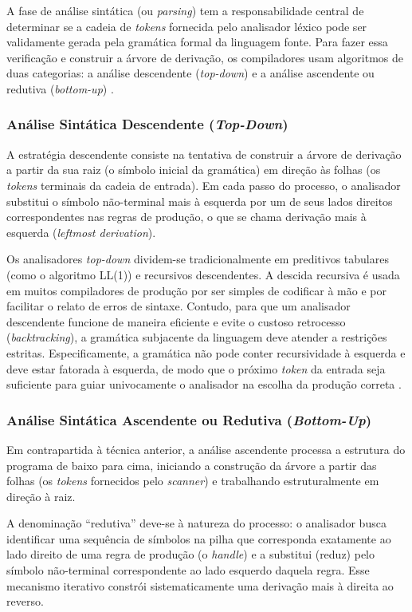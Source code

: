 A fase de análise sintática (ou \textit{parsing}) tem a responsabilidade central de determinar se a cadeia de \textit{tokens} fornecida pelo analisador léxico pode ser validamente gerada pela gramática formal da linguagem fonte. Para fazer essa verificação e construir a árvore de derivação, os compiladores usam algoritmos de duas categorias: a análise descendente (\textit{top-down}) e a análise ascendente ou redutiva (\textit{bottom-up}) \cite{aho1995,cooper2012}.

\subsubsection*{Análise Sintática Descendente (\textit{Top-Down})}
A estratégia descendente consiste na tentativa de construir a árvore de derivação a partir da sua raiz (o símbolo inicial da gramática) em direção às folhas (os \textit{tokens} terminais da cadeia de entrada). Em cada passo do processo, o analisador substitui o símbolo não-terminal mais à esquerda por um de seus lados direitos correspondentes nas regras de produção, o que se chama derivação mais à esquerda (\textit{leftmost derivation}).

Os analisadores \textit{top-down} dividem-se tradicionalmente em preditivos tabulares (como o algoritmo LL(1)) e recursivos descendentes. A descida recursiva é usada em muitos compiladores de produção por ser simples de codificar à mão e por facilitar o relato de erros de sintaxe. Contudo, para que um analisador descendente funcione de maneira eficiente e evite o custoso retrocesso (\textit{backtracking}), a gramática subjacente da linguagem deve atender a restrições estritas. Especificamente, a gramática não pode conter recursividade à esquerda e deve estar fatorada à esquerda, de modo que o próximo \textit{token} da entrada seja suficiente para guiar univocamente o analisador na escolha da produção correta \cite{nystrom2021,price2001}.

\subsubsection*{Análise Sintática Ascendente ou Redutiva (\textit{Bottom-Up})}
Em contrapartida à técnica anterior, a análise ascendente processa a estrutura do programa de baixo para cima, iniciando a construção da árvore a partir das folhas (os \textit{tokens} fornecidos pelo \textit{scanner}) e trabalhando estruturalmente em direção à raiz. 

A denominação ``redutiva'' deve-se à natureza do processo: o analisador busca identificar uma sequência de símbolos na pilha que corresponda exatamente ao lado direito de uma regra de produção (o \textit{handle}) e a substitui (reduz) pelo símbolo não-terminal correspondente ao lado esquerdo daquela regra. Esse mecanismo iterativo constrói sistematicamente uma derivação mais à direita ao reverso.

